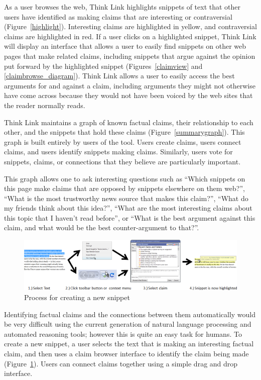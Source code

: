 \documentclass{chi2009}
\begin{document}
As a user browses the web, Think Link highlights snippets of text that other users have identified as making claims that are interesting or contraversial (Figure~\ref{highlight}). Interesting claims are highlighted in yellow, and contraversial claims are highlighted in red. If a user clicks on a highlighted snippet, Think Link will display an interface that allows a user to easily find snippets on other web pages that make related claims, including snippets that argue against the opinion put forward by the highlighted snippet (Figures~\ref{claimview} and \ref{claimbrowse_diagram}). Think Link allows a user to easily access the best arguments for and against a claim, including arguments they might not otherwise have come across because they would not have been voiced by the web sites that the reader normally reads.

Think Link maintains a graph of known factual claims, their relationship to each other, and the snippets that hold these claims (Figure~\ref{summarygraph}). This graph is built entirely by users of the tool. Users create claims, users connect claims, and users identify snippets making claims. Similarly, users vote for snippets, claims, or connections that they believe are particularly important.

This graph allows one to ask interesting questions such as ``Which snippets on this page make claims that are opposed by snippets elsewhere on them web?'', ``What is the most trustworthy news source that makes this claim?'', ``What do my friends think about this idea?'', ``What are the most interesting claims about this topic that I haven't read before'', or ``What is the best argument against this claim, and what would be the best counter-argument to that?''.

\begin{figure}[tb]
	\begin{center}
	\includegraphics[width=14cm]{../screenshots/newsnip_all.png}
	\caption{Process for creating a new snippet}
	\label{createprocess}
	\end{center}
\end{figure}

Identifying factual claims and the connections between them automatically would be very difficult using the current generation of natural language processing and automated reasoning tools; however this is quite an easy task for humans.  To create a new snippet, a user selects the text that is making an interesting factual claim, and then uses a claim browser interface to identify the claim being made (Figure~\ref{createprocess}). Users can connect claims together using a simple drag and drop interface.
\end{document}
